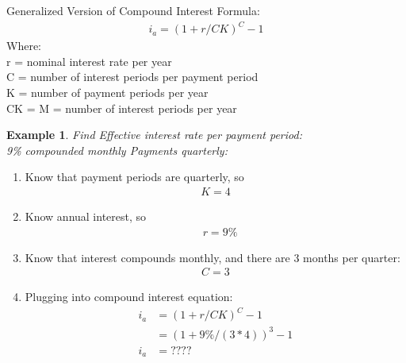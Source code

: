 \documentclass{report} %
\newtheorem{exmp}{Example}
\begin{document}
Generalized Version of Compound Interest Formula:
\begin{equation*}
    \begin{aligned}
        i_a = (1+ r/CK)^C - 1
    \end{aligned}
\end{equation*}
Where: \\ %
r = nominal interest rate per year \\
C = number of interest periods per payment period \\
K = number of payment periods per year \\
CK = M = number of interest periods per year \\

\begin{exmp}
    Find Effective interest rate per payment period: \\
    9\% compounded monthly \quad Payments quarterly:
\end{exmp}
\begin{enumerate}
    \item Know that payment periods are quarterly, so
    \begin{equation*}
        \begin{aligned}
            K = 4
        \end{aligned}
    \end{equation*}
    \item Know annual interest, so 
    \begin{equation*}
        \begin{aligned}
            &r = 9\% 
        \end{aligned}
    \end{equation*}
    \item Know that interest compounds monthly, and there are 3 months per quarter:
    \begin{equation*}
        \begin{aligned}
            C = 3
        \end{aligned}
    \end{equation*}
    \item Plugging into compound interest equation:
    \begin{equation*}
        \begin{aligned}
            i_a &= (1 + r/CK)^C - 1 \\
                &= (1 + 9\%/(3*4))^3 - 1 \\
            i_a &= ???? %
        \end{aligned}
    \end{equation*}
\end{enumerate}
\end{document}
